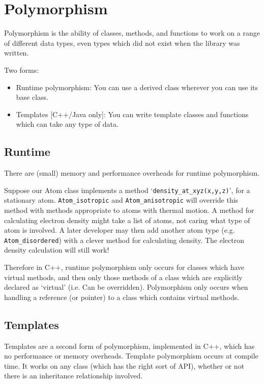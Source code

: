 \documentclass[11pt]{book} %
\begin{document}
\section{Polymorphism}

Polymorphism is the ability of classes, methods, and functions to work on a range of different data types, even types which did not exist when the library was written.

Two forms:
\begin{itemize}
\item Runtime polymorphism: You can use a derived class wherever you can use its base class.
\item Templates [C++/Java only]: You can write template classes and functions which can take any type of data.
\end{itemize}

\subsection{Runtime}

There are (small) memory and performance overheads for runtime polymorphism.

Suppose our Atom class implements a method ‘\verb|density_at_xyz(x,y,z)|’, for a stationary atom.
\verb|Atom_isotropic| and \verb|Atom_anisotropic| will override this method with methods appropriate to atoms with thermal motion. A method for calculating electron density might take a list of atoms, not caring what type of atom is involved. A later developer may then add another atom type (e.g. \verb|Atom_disordered|) with a clever method for calculating
density. The electron density calculation will still work!

Therefore in C++, runtime polymorphism only occurs for classes which have virtual methods, and then only those
methods of a class which are explicitly declared as ‘virtual’ (i.e. Can be overridden). Polymorphism only occurs when handling a reference (or pointer) to a class which contains virtual methods.

\subsection{Templates}

Templates are a second form of polymorphism, implemented in C++, which has no performance or memory overheads.
Template polymorphism occurs at compile time. It works on any class (which has the right sort of API), whether or not there is an inheritance relationship involved.
\end{document}
